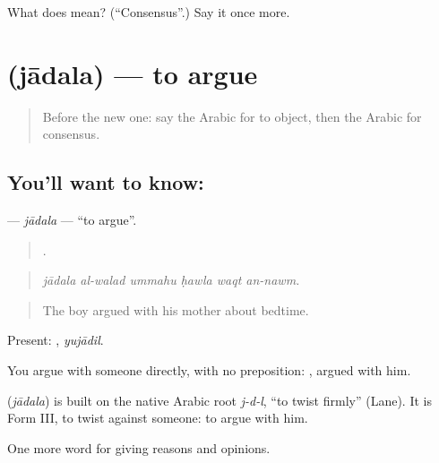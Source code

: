 \begin{tcolorbox}[breakable,colback=teal!4,colframe=teal!35!black,title={Before you move on}]
What does  mean? (\textquotedblleft{}Consensus\textquotedblright{}.) Say it once more.
\end{tcolorbox}
\section[\texorpdfstring{\ar{جادل} (jādala)}{جادل (jādala)}]{ (jādala) — to argue}

\label{lesson:AR-C360-jadala}



\begin{quote}
Before the new one: say the Arabic for to object, then the Arabic for consensus.
\end{quote}

\subsection*{You'll want to know: }
\textbf{} — \emph{jādala} — \textquotedblleft{}to argue\textquotedblright{}.

\begin{quote}
     .
\end{quote}

\begin{quote}
\emph{jādala al-walad ummahu ḥawla waqt an-nawm.}
\end{quote}

\begin{quote}
The boy argued with his mother about bedtime.
\end{quote}

Present: , \emph{yujādil}.

You argue with someone directly, with no preposition: , argued with him.

\begin{cousinweb}
\textbf{} (\emph{jādala}) is built on the native Arabic root \emph{j-d-l}, \textquotedblleft{}to twist firmly\textquotedblright{} (Lane). It is Form III, to twist against someone: to argue with him.
\end{cousinweb}

\begin{grammarlens}[title={What you've built}]
One more word for giving reasons and opinions.
\end{grammarlens}


